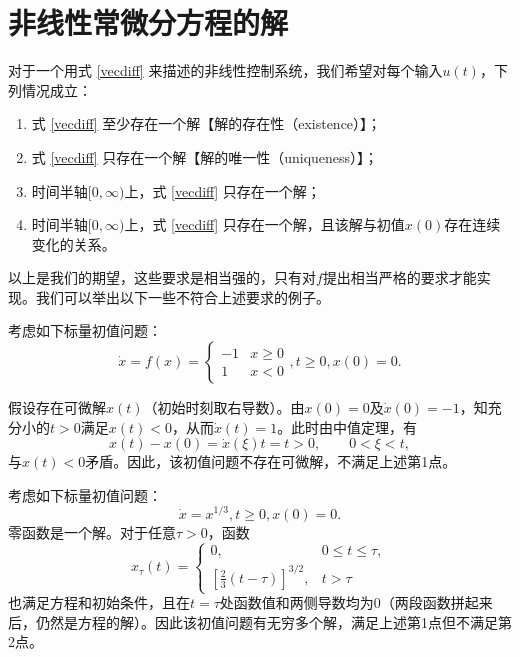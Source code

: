 \section{非线性常微分方程的解}\label{1Cref}

对于一个用式 \eqref{vecdiff} 来描述的非线性控制系统，我们希望对每个输入$u(t)$，下列情况成立：
\begin{enumerate}
  \item 式 \eqref{vecdiff} 至少存在一个解【解的存在性（existence）】；
  \item 式 \eqref{vecdiff} 只存在一个解【解的唯一性（uniqueness）】；
  \item 时间半轴$[0,\infty)$上，式 \eqref{vecdiff} 只存在一个解；
  \item 时间半轴$[0,\infty)$上，式 \eqref{vecdiff} 只存在一个解，且该解与初值$x(0)$存在连续变化的关系。
\end{enumerate}

以上是我们的期望，这些要求是相当强的，只有对$f$提出相当严格的要求才能实现。我们可以举出以下一些不符合上述要求的例子。
\begin{example}[不存在解] 
  考虑如下标量初值问题：
  \begin{equation*}
    \dot{x}=f(x)=\begin{cases}
      -1&x\ge0\\
      1&x<0
    \end{cases},t\ge 0,x(0)=0.
  \end{equation*}

  假设存在可微解$x(t)$（初始时刻取右导数）。由$x(0)=0$及$\dot{x}(0)=-1$，知充分小的$t>0$满足$x(t)<0$，从而$\dot{x}(t)=1$。此时由中值定理，有
  \[
    x(t)-x(0)=\dot{x}(\xi)t=t>0,\qquad 0<\xi<t,
  \]
  与$x(t)<0$矛盾。因此，该初值问题不存在可微解，不满足上述第1点。
\end{example}
\begin{example}[解存在但不唯一] 
  考虑如下标量初值问题：
  \begin{equation*}
    \dot{x}=x^{1/3},t\ge0,x(0)=0.
  \end{equation*}
  零函数是一个解。对于任意$\tau>0$，函数
  \[
    x_\tau(t)=\begin{cases}
      0,&0\le t\le\tau,\\
      \displaystyle\left[\frac{2}{3}(t-\tau)\right]^{3/2},&t>\tau
    \end{cases}
  \]
  也满足方程和初始条件，且在$t=\tau$处函数值和两侧导数均为$0$（两段函数拼起来后，仍然是方程的解）。因此该初值问题有无穷多个解，满足上述第1点但不满足第2点。
\end{example}

